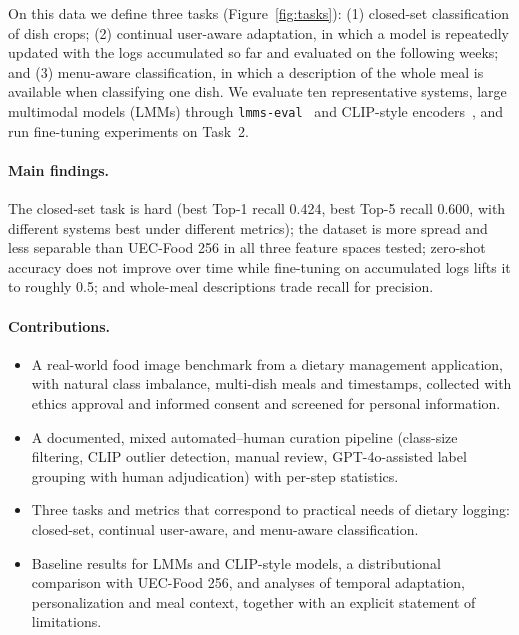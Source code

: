 \documentclass[sigconf, nonacm]{acmart}
\begin{document}
On this data we define three tasks (Figure~\ref{fig:tasks}): (1) closed-set classification of dish crops; (2) continual user-aware adaptation, in which a model is repeatedly updated with the logs accumulated so far and evaluated on the following weeks; and (3) menu-aware classification, in which a description of the whole meal is available when classifying one dish. We evaluate ten representative systems, large multimodal models (LMMs) through \texttt{lmms-eval}~\cite{lmms_eval2024,zhang2024lmmsevalrealitycheckevaluation} and CLIP-style encoders~\cite{CLIP,sun2023eva}, and run fine-tuning experiments on Task~2.

\paragraph{Main findings.} The closed-set task is hard (best Top-1 recall 0.424, best Top-5 recall 0.600, with different systems best under different metrics); the dataset is more spread and less separable than UEC-Food 256 in all three feature spaces tested; zero-shot accuracy does not improve over time while fine-tuning on accumulated logs lifts it to roughly 0.5; and whole-meal descriptions trade recall for precision.

\paragraph{Contributions.}
\begin{itemize}[leftmargin=*,topsep=2pt,itemsep=1pt]
  \item A real-world food image benchmark from a dietary management application, with natural class imbalance, multi-dish meals and timestamps, collected with ethics approval and informed consent and screened for personal information.
  \item A documented, mixed automated--human curation pipeline (class-size filtering, CLIP outlier detection, manual review, GPT-4o-assisted label grouping with human adjudication) with per-step statistics.
  \item Three tasks and metrics that correspond to practical needs of dietary logging: closed-set, continual user-aware, and menu-aware classification.
  \item Baseline results for LMMs and CLIP-style models, a distributional comparison with UEC-Food 256, and analyses of temporal adaptation, personalization and meal context, together with an explicit statement of limitations.
\end{itemize}
\end{document}
